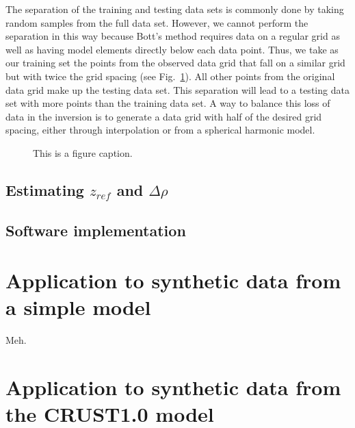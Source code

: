 \documentclass[extra,mreferee]{gji}
\begin{document}
The separation of the training and testing data sets is commonly done by taking
random samples from the full data set.
However, we cannot perform the separation in this way because
Bott's method requires data on a regular grid as well as having model elements
directly below each data point.
Thus, we take as our training set the points from the observed data grid that
fall on a similar grid but with twice the grid spacing
(see Fig.~\ref{fig:grid_separation}).
All other points from the original data grid
make up the testing data set.
This separation will lead to
a testing data set with more points than the training data set.
A way to balance this loss of data in the inversion
is to generate a data grid with half of the desired grid spacing,
either through interpolation
or from a spherical harmonic model.

\begin{figure}
    \centering
    \caption{This is a figure caption.}
    \label{fig:grid_separation}
\end{figure}


\subsection{Estimating $z_{ref}$ and $\Delta\rho$}






\subsection{Software implementation}


\section{Application to synthetic data from a simple model}


Meh.


\section{Application to synthetic data from the CRUST1.0 model}
\end{document}
